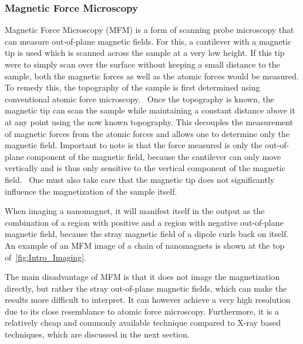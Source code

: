 \documentclass[11pt,a4paper,english]{article}
\begin{document}
\subsubsection{Magnetic Force Microscopy}
Magnetic Force Microscopy (MFM) is a form of scanning probe microscopy that can measure out-of-plane magnetic fields. For this, a cantilever with a magnetic tip is used which is scanned across the sample at a very low height. If this tip were to simply scan over the surface without keeping a small distance to the sample, both the magnetic forces as well as the atomic forces would be measured. To remedy this, the topography of the sample is first determined using conventional atomic force microscopy.~\cite{NML_Carlton, PEEM} Once the topography is known, the magnetic tip can scan the sample while maintaining a constant distance above it at any point using the now known topography. This decouples the measurement of magnetic forces from the atomic forces and allows one to determine only the magnetic field. Important to note is that the force measured is only the out-of-plane component of the magnetic field, because the cantilever can only move vertically and is thus only sensitive to the vertical component of the magnetic field.~\cite{NML_Carlton} One must also take care that the magnetic tip does not significantly influence the magnetization of the sample itself.~\cite{Probing_MagnetoOptics} \par
When imaging a nanomagnet, it will manifest itself in the output as the combination of a region with positive and a region with negative out-of-plane magnetic field, because the stray magnetic field of a dipole curls back on itself.~\cite{NML_Carlton} An example of an MFM image of a chain of nanomagnets is shown at the top of~\cref{fig:Intro_Imaging}. \par
The main disadvantage of MFM is that it does not image the magnetization directly, but rather the stray out-of-plane magnetic fields, which can make the results more difficult to interpret. It can however achieve a very high resolution due to its close resemblance to atomic force microscopy. Furthermore, it is a relatively cheap and commonly available technique compared to X-ray based techniques, which are discussed in the next section.
\end{document}
